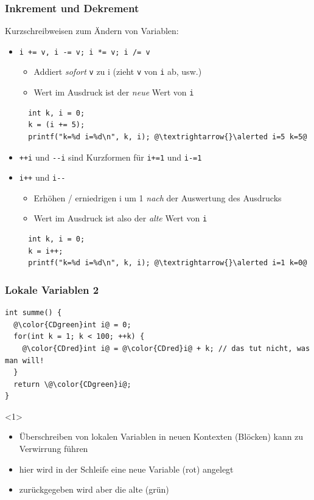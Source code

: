 \documentclass{slides}
\begin{document}
\begin{frame}[fragile]
  \frametitle{Inkrement und Dekrement}

  Kurzschreibweisen zum Ändern von Variablen:

  \begin{itemize}
  \item {\alerted \lstinline!i += v, i -= v; i *= v; i /= v!}
    \begin{itemize}
    \item Addiert \emph{sofort} \lstinline!v! zu i (zieht \lstinline!v! von \lstinline!i! ab, usw.)
    \item Wert im Ausdruck ist der \emph{neue} Wert von \lstinline!i!
    \end{itemize}
\begin{lstlisting}
  int k, i = 0;
  k = (i += 5);
  printf("k=%d i=%d\n", k, i); @\textrightarrow{}\alerted i=5 k=5@
\end{lstlisting}
  \item {\alerted \lstinline!++i!} und {\alerted \lstinline!--i!} sind Kurzformen für \lstinline!i+=1! und
    \lstinline!i-=1!
  \item {\alerted \lstinline!i++!} und {\alerted \lstinline!i--!}
    \begin{itemize}
    \item Erhöhen / erniedrigen i um 1 \emph{nach} der Auswertung des Ausdrucks
    \item Wert im Ausdruck ist also der \emph{alte} Wert von \lstinline!i!
    \end{itemize}
\begin{lstlisting}
  int k, i = 0;
  k = i++;
  printf("k=%d i=%d\n", k, i); @\textrightarrow{}\alerted i=1 k=0@
\end{lstlisting}
  \end{itemize}
\end{frame}

\begin{frame}[fragile]
  \frametitle{Lokale Variablen 2}
\begin{lstlisting}
int summe() {
  @\color{CDgreen}int i@ = 0;
  for(int k = 1; k < 100; ++k) {
    @\color{CDred}int i@ = @\color{CDred}i@ + k; // das tut nicht, was man will!
  }
  return \@\color{CDgreen}i@;
}
\end{lstlisting}

  \begin{onlyenv}<1>
    \begin{itemize}
    \item Überschreiben von lokalen Variablen in neuen Kontexten (Blöcken)
      kann zu Verwirrung führen
    \item hier wird in der Schleife eine neue Variable (rot) angelegt
    \item zurückgegeben wird aber die alte (grün)
    \end{itemize}
  \end{onlyenv}
\end{frame}
\end{document}
